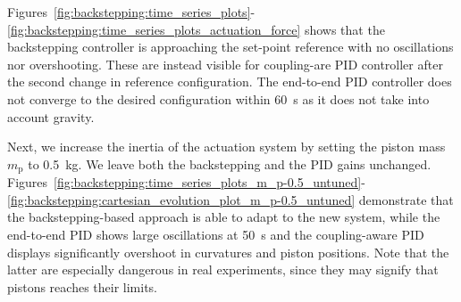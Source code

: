 Figures~\ref{fig:backstepping:time_series_plots}-\ref{fig:backstepping:time_series_plots_actuation_force} shows that the backstepping controller is approaching the set-point reference with no oscillations nor overshooting. These are instead visible for coupling-are PID controller after the second change in reference configuration. 
The end-to-end PID controller does not converge to the desired configuration within \SI{60}{s} as it does not take into account gravity.

Next, we increase the inertia of the actuation system by setting the piston mass $m_\mathrm{p}$ to \SI{0.5}{kg}. We leave both the backstepping and the PID gains unchanged. Figures~\ref{fig:backstepping:time_series_plots_m_p-0.5_untuned}-\ref{fig:backstepping:cartesian_evolution_plot_m_p-0.5_untuned} demonstrate that the backstepping-based approach is able to adapt to the new system, while the end-to-end PID shows large oscillations at \SI{50}{s} and the coupling-aware PID displays significantly overshoot in curvatures and piston positions. 
Note that the latter are especially dangerous in real experiments, since they may signify that pistons reaches their limits.

